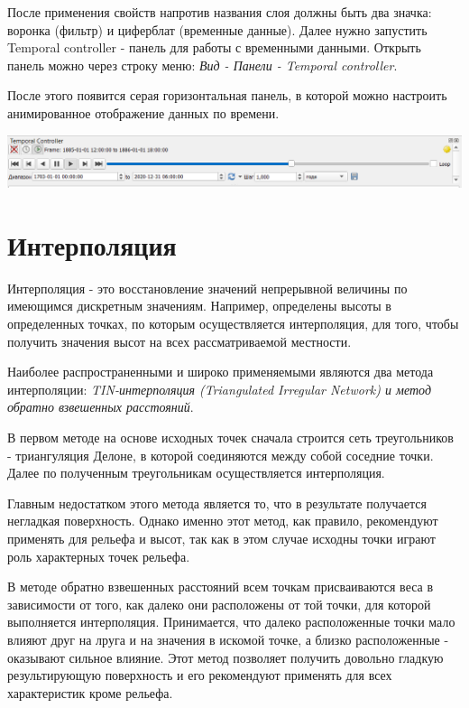 \documentclass[
]{book}
\begin{document}
После применения свойств напротив названия слоя должны быть два значка: воронка (фильтр) и циферблат (временные данные). Далее нужно запустить Temporal controller - панель для работы с временными данными. Открыть панель можно через строку меню: \emph{Вид - Панели - Temporal controller}.

После этого появится серая горизонтальная панель, в которой можно настроить анимированное отображение данных по времени.

\includegraphics{figures/62.png}

\hypertarget{ux438ux43dux442ux435ux440ux43fux43eux43bux44fux446ux438ux44f}{%
\chapter{Интерполяция}\label{ux438ux43dux442ux435ux440ux43fux43eux43bux44fux446ux438ux44f}}

Интерполяция - это восстановление значений непрерывной величины по имеющимся дискретным значениям. Например, определены высоты в определенных точках, по которым осуществляется интерполяция, для того, чтобы получить значения высот на всех рассматриваемой местности.

Наиболее распространенными и широко применяемыми являются два метода интерполяции: \emph{TIN-интерполяция (Triangulated Irregular Network) и метод обратно взвешенных расстояний}.

В первом методе на основе исходных точек сначала строится сеть треугольников - триангуляция Делоне, в которой соединяются между собой соседние точки. Далее по полученным треугольникам осуществляется интерполяция.

Главным недостатком этого метода является то, что в результате получается негладкая поверхность. Однако именно этот метод, как правило, рекомендуют применять для рельефа и высот, так как в этом случае исходны точки играют роль характерных точек рельефа.

В методе обратно взвешенных расстояний всем точкам присваиваются веса в зависимости от того, как далеко они расположены от той точки, для которой выполняется интерполяция. Принимается, что далеко расположенные точки мало влияют друг на лруга и на значения в искомой точке, а близко расположенные - оказывают сильное влияние. Этот метод позволяет получить довольно гладкую результирующую поверхность и его рекомендуют применять для всех характеристик кроме рельефа.
\end{document}
